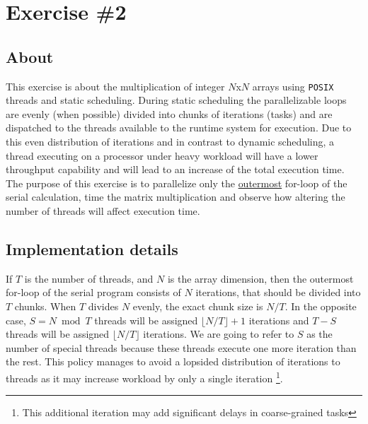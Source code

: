 \documentclass{article}
\begin{document}

\section{Exercise \#2}

\subsection{About}
This exercise is about the multiplication of integer $N$x$N$ arrays using \texttt{POSIX} threads
and static scheduling. During static scheduling the parallelizable loops are evenly (when
possible) divided into chunks of iterations (tasks) and are dispatched to the threads available
to the runtime system for execution. Due to this even distribution of iterations and in contrast
to dynamic scheduling, a thread executing on a processor under heavy workload will have a lower
throughput capability and will lead to an increase of the total execution time. The purpose of
this exercise is to parallelize only the \underline{outermost} for-loop of the serial calculation,
time the matrix multiplication and observe how altering the number of threads will affect execution
time.

\subsection{Implementation details}
If $T$ is the number of threads, and $N$ is the array dimension, then the outermost
for-loop of the serial program consists of $N$ iterations, that should be divided
into $T$ chunks. When $T$ divides $N$ evenly, the exact chunk size is $N/T$. In the
opposite case, $S=N \bmod T$ threads will be assigned $\lfloor{N/T}\rfloor+1$ iterations
and $T-S$ threads will be assigned $\lfloor{N/T}\rfloor$ iterations. We are going
to refer to $S$ as the number of special threads because these threads execute one
more iteration than the rest. This policy manages to avoid a lopsided distribution
of iterations to threads as it may increase workload by only a single iteration
\footnote{This additional iteration may add significant delays in coarse-grained
tasks}.

\newpage
\end{document}

